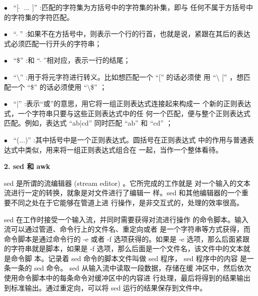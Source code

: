 \documentclass[12pt，a4paper]{article}
\numberwithin{equation}{section}
\begin{document}
$\bullet$~ “[$~\hat{}~$ ... ]” :匹配的字符集为方括号中的字符集的补集，即与
任何不属于方括号中的字符集的字符匹配。

$\bullet$~ “$~\hat{}~$” :如果不在方括号中，则表示一个行的行首，也就是说，紧跟在其后的表达式必须匹配一行开头的字符串；

$\bullet$~ “\$” :和 “$~\hat{}~$”相对应，表示一行的结尾；

$\bullet$~ “$\setminus$” :用于将元字符进行转义。比如想匹配一个 “[” 的话必须使
用 “$\setminus$ [” ，想匹配一个 “\$” 的话必须使用 “$\setminus$\$” ；

$\bullet$~ “|” :表示“或”的意思，用它将一组正则表达式连接起来构成一
个新的正则表达式，一个字符串只要与这些正则表达式中的任
何一个匹配，便与整个正则表达式匹配。例如，表达式 “ab|cd”
同时匹配 “ab” 和 “cd” ；

$\bullet$~ “(...)” :其中括号中是一个正则表达式。圆括号在正则表达式
中的作用与普通表达式中类似，用来将一组正则表达式组合在
一起，当作一个整体看待。


\textbf{2. sed 和 awk}

sed 是所谓的流编辑器 (stream editor) 。它所完成的工作就是
对一个输入的文本流进行一定的转换，就象是对文件进行了编辑一
样。sed 和其他编辑器的一个重要不同之处在于它能够在管道上进
行操作，是非交互式的，处理的效率很高。

sed 在工作时接受一个输入流，并同时需要获得对流进行操作
的命令脚本。输入流可以通过管道、命令行上的文件名、重定向或者
是一个字符串等方式获得，而命令脚本是通过命令行的 -e 或者 -f
选项获得的。如果是 -e 选项，那么后面紧跟的字符串就是脚本，如果是 -f 选项，那么后面是一个文件名，该文件中的文本就是命令脚
本。记录着 sed 命令的脚本文件叫做 sed 程序， sed 程序中的内容
是一条一条的 sed 命令。 sed 从输入流中读取一段数据，存储在缓
冲区中，然后依次使用命令脚本中的每条命令对缓冲区中的内容进
行处理，最后将得到的结果输出到标准输出。通过重定向，可以将
sed 运行的结果保存到文件中。
\end{document}
